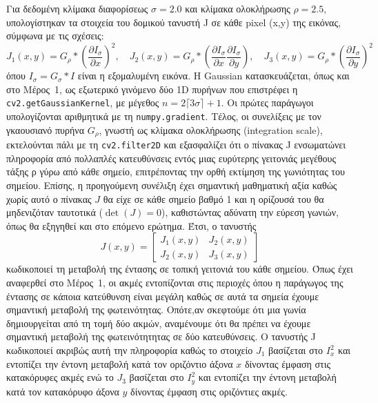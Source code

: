 \documentclass[12pt, a4paper]{article}
\begin{document}
Για δεδομένη κλίμακα διαφορίσεως $\sigma=2.0$ και κλίμακα ολοκλήρωσης $\rho=2.5$,
υπολογίστηκαν τα στοιχεία του δομικού τανυστή J σε κάθε pixel (x,y) της
εικόνας, σύμφωνα με τις σχέσεις:
\begin{equation}
    J_1(x,y) = G_\rho * \left( \frac{\partial I_\sigma}{\partial x} \right)^2,
    \quad
    J_2(x,y) = G_\rho * \left( \frac{\partial I_\sigma}{\partial x}
    \frac{\partial I_\sigma}{\partial y} \right),
    \quad
    J_3(x,y) = G_\rho * \left( \frac{\partial I_\sigma}{\partial y} \right)^2
\end{equation}
όπου $I_\sigma = G_\sigma * I$ είναι η εξομαλυμένη εικόνα. Η Gaussian
κατασκευάζεται, όπως και στο Μέρος~1, ως εξωτερικό γινόμενο δύο 1D πυρήνων
που επιστρέφει η \texttt{cv2.getGaussianKernel}, με μέγεθος
$n = 2\lceil 3\sigma \rceil + 1$. Οι πρώτες παράγωγοι υπολογίζονται αριθμητικά
με τη \texttt{numpy.gradient}. Τέλος, οι συνελίξεις με τον γκαουσιανό πυρήνα
$G_\rho$, γνωστή ως κλίμακα ολοκλήρωσης (integration scale), εκτελούνται πάλι  με τη \texttt{cv2.filter2D} και εξασφαλίζει ότι ο πίνακας J ενσωματώνει πληροφορία από πολλαπλές 
κατευθύνσεις εντός μιας ευρύτερης γειτονιάς μεγέθους τάξης ρ γύρω από κάθε σημείο, επιτρέποντας την ορθή εκτίμηση της γωνιότητας του σημείου. Επίσης, η προηγούμενη συνέλιξη έχει σημαντική μαθηματική αξία καθώς χωρίς αυτό ο πίνακας $J$ θα είχε σε κάθε σημείο βαθμό 1 και η ορίζουσά του θα μηδενιζόταν ταυτοτικά ($\det(J) = 0$), καθιστώντας αδύνατη την εύρεση γωνιών, όπως θα εξηγηθεί και στο επόμενο ερώτημα.  Έτσι, ο τανυστής
\begin{equation}
    J(x,y) =
    \begin{bmatrix}
        J_1(x,y) & J_2(x,y) \\
        J_2(x,y) & J_3(x,y)
    \end{bmatrix}
\end{equation}
κωδικοποιεί τη μεταβολή της έντασης σε τοπική γειτονιά του κάθε σημείου. Όπως έχει αναφερθεί στο Μέρος~1, οι ακμές εντοπίζονται στις περιοχές  όπου η παράγωγος της έντασης
σε κάποια κατεύθυνση  είναι μεγάλη καθώς σε αυτά τα σημεία έχουμε σημαντική μεταβολή της φωτεινότητας. Οπότε,αν σκεφτούμε ότι μια γωνία δημιουργείται από τη τομή δύο ακμών, αναμένουμε ότι θα πρέπει να έχουμε σημαντική μεταβολή της φωτεινότητητας σε δύο κατευθύνσεις. Ο τανυστής J κωδικοποιεί ακριβώς αυτή την πληροφορία καθώς 
το στοιχείο $J_1$ βασίζεται στο $I_x^2$ και εντοπίζει την έντονη μεταβολή κατά τον οριζόντιο άξονα  $x$ δίνοντας έμφαση στις κατακόρυφες ακμές ενώ το $J_3$ βασίζεται στο $I_y^2$ και εντοπίζει την έντονη μεταβολή κατά τον κατακόρυφο άξονα  $y$ δίνοντας έμφαση στις οριζόντιες ακμές.
\end{document}
